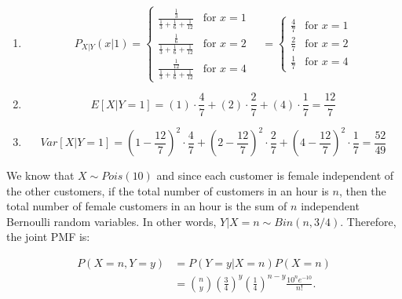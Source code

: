 \begin{problem}{5} $ $
\begin{enumerate}

\item 


	\begin{equation*}  
  P_{X|Y}(x|1) = \begin{cases}
                                   \frac{\frac{1}{3}}{\frac{1}{3}+\frac{1}{6}+\frac{1}{12}} & \text{for $x = 1$} \\
                                   \frac{\frac{1}{6}}{\frac{1}{3}+\frac{1}{6}+\frac{1}{12}}& \text{for $x = 2$} \\
                                   \frac{\frac{1}{12}}{\frac{1}{3}+\frac{1}{6}+\frac{1}{12}} & \text{for $x = 4$} 
       \end{cases} \quad
= \begin{cases}
                                   \frac{4}{7} & \text{for $x = 1$} \\
                                    \frac{2}{7} & \text{for $x = 2$} \\
                                   \frac{1}{7} & \text{for $x = 4$} 
       \end{cases}
\end{equation*}

\item

\begin{equation*}
E[X|Y=1] = (1)\cdot \frac{4}{7}+(2)\cdot \frac{2}{7}+(4)\cdot \frac{1}{7} = \frac{12}{7}
\end{equation*}

\item

\begin{equation*}
Var[X|Y=1] = \left(1-\frac{12}{7}\right)^2\cdot \frac{4}{7}+\left(2-\frac{12}{7}\right)^2\cdot \frac{2}{7}+\left(4-\frac{12}{7}\right)^2\cdot \frac{1}{7} = \frac{52}{49}
\end{equation*}


\end{enumerate}
\end{problem}


\begin{problem}{6}  We know that $X\sim Pois(10)$ and since each customer is female independent of the other customers, if the total number of customers in an hour is $n$, then the total number of female customers in an hour is the sum of $n$ independent Bernoulli random variables.  In other words, $Y|X=n \sim Bin(n, 3/4)$.  Therefore, the joint PMF is:

\begin{align*}
P(X=n, Y=y) &= P(Y=y|X=n)P(X=n) \\
& = \binom{n}{y}\left ( \frac{3}{4} \right)^y \left ( \frac{1}{4} \right)^{n-y} \frac{10^n e^{-10}}{n!}.
\end{align*}

\end{problem}



